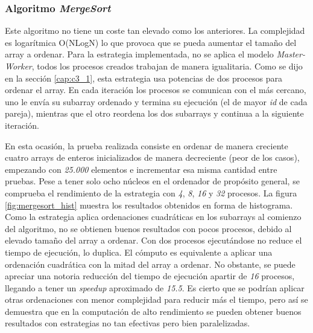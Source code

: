 		
		\subsubsection{Algoritmo \textit{MergeSort}}
		
		Este algoritmo no tiene un coste tan elevado como los anteriores. La complejidad es logarítmica O(NLogN) lo que provoca que se pueda aumentar el tamaño del array a ordenar. Para la estrategia implementada, no se aplica el modelo \textit{Master-Worker}, todos los procesos creados trabajan de manera igualitaria. Como se dijo en la sección \ref{cap:c3_1}, esta estrategia usa potencias de dos procesos para ordenar el array. En cada iteración los procesos se comunican con el más cercano, uno le envía su subarray ordenado y termina su ejecución (el de mayor \textit{id} de cada pareja), mientras que el otro reordena los dos subarrays y continua a la siguiente iteración.
					
		
		En esta ocasión, la prueba realizada consiste en ordenar de manera creciente cuatro arrays de enteros inicializados de manera decreciente (peor de los casos), empezando con \textit{25.000} elementos e incrementar esa misma cantidad entre pruebas. Pese a tener solo ocho núcleos en el ordenador de propósito general, se comprueba el rendimiento de la estrategia con \textit{4}, \textit{8}, \textit{16} y \textit{32} procesos. La figura \ref{fig:mergesort_hist} muestra los resultados obtenidos en forma de histograma. Como la estrategia aplica ordenaciones cuadráticas en los subarrays al comienzo del algoritmo, no se obtienen buenos resultados con pocos procesos, debido al elevado tamaño del array a ordenar. Con dos procesos ejecutándose no reduce el tiempo de ejecución, lo duplica. El cómputo es equivalente a aplicar una ordenación cuadrática con la mitad del array a ordenar. No obstante, se puede apreciar una notoria reducción del tiempo de ejecución apartir de \textit{16} procesos, llegando a tener un \textit{speedup} aproximado de \textit{15.5}. Es cierto que se podrían aplicar otras ordenaciones con menor complejidad para reducir más el tiempo, pero así se demuestra que en la computación de alto rendimiento se pueden obtener buenos resultados con estrategias no tan efectivas pero bien paralelizadas.
		
